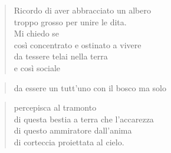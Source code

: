 
\begin{verse}    
Ricordo di aver abbracciato un albero\\
troppo grosso per unire le dita.\\
Mi chiedo se\\ 
così concentrato e ostinato a vivere\\
da tessere telai nella terra\\
e così sociale\\
\end{verse}
\vspace{-0.9cm}

\begin{verse}
    da essere un tutt'uno con il bosco \hfill ma solo
\end{verse} 
\vspace{-0.9cm}

\begin{verse}
percepisca al tramonto\\
di questa bestia a terra che l'accarezza\\
di questo ammiratore dall'anima\\
di corteccia proiettata al cielo.
\end{verse}